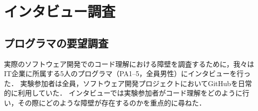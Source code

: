 \section{インタビュー調査}
\label{section:Formative_Study}

\subsection{プログラマの要望調査}

実際のソフトウェア開発でのコード理解における障壁を調査するために，我々はIT企業に所属する5人のプログラマ（PA1--5，全員男性）にインタビューを行った．
実験参加者は全員，ソフトウェア開発プロジェクトにおいてGitHubを日常的に利用していた．
インタビューでは実験参加者がコード理解をどのように行い，その際にどのような障壁が存在するのかを重点的に尋ねた．








